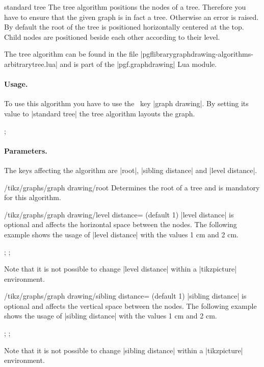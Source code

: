 \begin{gdalgorithm}{standard tree}
The tree algorithm positions the nodes of a tree. Therefore you have to ensure that the given graph is in fact a tree. Otherwise an error is raised. By default the root of the tree is positioned horizontally centered at the top. Child nodes are positioned beside each other according to their level. 

The tree algorithm can be found in the file |pgflibrarygraphdrawing-algorithms-arbitrarytree.lua| and is part of the |pgf.graphdrawing| Lua module.

\paragraph{Usage.} 

To use this algorithm you have to use the \tikzname\ key |graph drawing|. By setting its value to |standard tree| the tree algorithm layouts the graph.
\begin{codeexample}[]
\tikz [graph drawing=standard tree]
  ;
\end{codeexample}
\paragraph{Parameters.} 
The keys affecting the algorithm are |root|, |sibling distance| and |level distance|.

\begin{key}{/tikz/graphs/graph drawing/root}
  Determines the root of a tree and is mandatory for this algorithm.
\end{key}

\begin{key}{/tikz/graphs/graph drawing/level distance= (default 1)}
  |level distance| is optional and affects the horizontal space between the nodes.
  The following example shows the usage of |level distance| with the values 1 cm and 2 cm.
  \begin{codeexample}[]
    \tikz [graph drawing={standard tree, level distance=1 cm}]
    ;
    \tikz [graph drawing={standard tree, level distance=2 cm}]
    ;
  \end{codeexample}
  Note that it is not possible to change |level distance| within a |tikzpicture| environment.
\end{key}

\begin{key}{/tikz/graphs/graph drawing/sibling distance= (default 1)}
  |sibling distance| is optional and affects the vertical space between the nodes.
  The following example shows the usage of |sibling distance| with the values 1 cm and 2 cm.
  \begin{codeexample}[]
    \tikz [graph drawing={standard tree, sibling distance=1 cm}]
    ;
    \tikz [graph drawing={standard tree, sibling distance=2 cm}]
    ;
  \end{codeexample}
  Note that it is not possible to change |sibling distance| within a |tikzpicture| environment.
\end{key}


\end{gdalgorithm}
